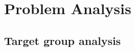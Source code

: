 



\chapter{Problem Analysis}






\section{Target group analysis}



\begingroup
	\raggedright
\endgroup

